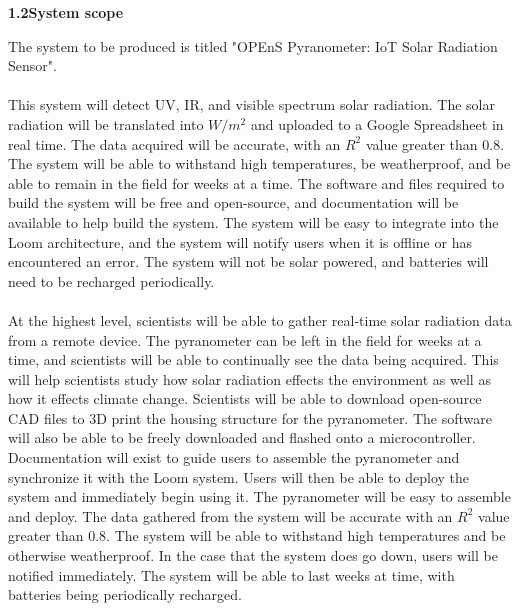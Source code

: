 \documentclass[10pt,draftclsnofoot,onecolumn,letterpaper]{article}
\begin{document}
{\fontsize{10pt}{12.0pt} \textbf{1.2\quad System scope}\\\selectfont 
\par}\par
{\fontsize{10pt}{12.0pt} The system to be produced is titled "OPEnS Pyranometer: IoT Solar Radiation Sensor".\\\\This system will detect UV, IR, and visible spectrum solar radiation. The solar radiation will be translated into $W/m^2$ and uploaded to a Google Spreadsheet in real time. The data acquired will be accurate, with an $R^2$ value greater than 0.8. The system will be able to withstand high temperatures, be weatherproof, and be able to remain in the field for weeks at a time. The software and files required to build the system will be free and open-source, and documentation will be available to help build the system. The system will be easy to integrate into the Loom architecture, and the system will notify users when it is offline or has encountered an error. The system will not be solar powered, and batteries will need to be recharged periodically.\\\\At the highest level, scientists will be able to gather real-time solar radiation data from a remote device. The pyranometer can be left in the field for weeks at a time, and scientists will be able to continually see the data being acquired. This will help scientists study how solar radiation effects the environment as well as how it effects climate change. Scientists will be able to download open-source CAD files to 3D print the housing structure for the pyranometer. The software will also be able to be freely downloaded and flashed onto a microcontroller. Documentation will exist to guide users to assemble the pyranometer and synchronize it with the Loom system. Users will then be able to deploy the system and immediately begin using it. The pyranometer will be easy to assemble and deploy. The data gathered from the system will be accurate with an $R^2$ value greater than 0.8. The system will be able to withstand high temperatures and be otherwise weatherproof. In the case that the system does go down, users will be notified immediately. The system will be able to last weeks at time, with batteries being periodically recharged. \\\selectfont 
\par}\par
\end{document}
